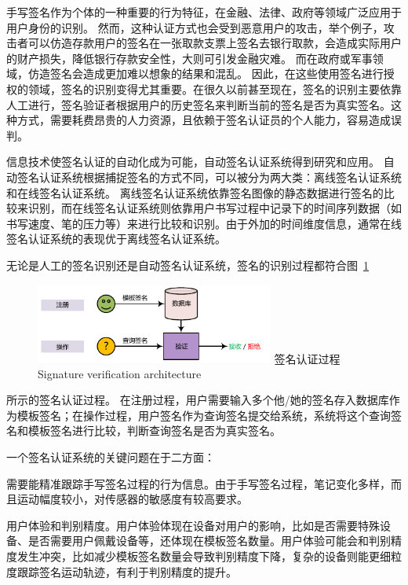 手写签名作为个体的一种重要的行为特征，在金融、法律、政府等领域广泛应用于用户身份的识别。 然而，这种认证方式也会受到恶意用户的攻击，举个例子，攻击者可以仿造存款用户的签名在一张取款支票上签名去银行取款，会造成实际用户的财产损失，降低银行存款安全性，大则可引发金融灾难。 而在政府或军事领域，仿造签名会造成更加难以想象的结果和混乱。 因此，在这些使用签名进行授权的领域，签名的识别变得尤其重要。在很久以前甚至现在，签名的识别主要依靠人工进行，签名验证者根据用户的历史签名来判断当前的签名是否为真实签名。这种方式，需要耗费昂贵的人力资源，且依赖于签名认证员的个人能力，容易造成误判。

信息技术使签名认证的自动化成为可能，自动签名认证系统得到研究和应用。 自动签名认证系统根据捕捉签名的方式不同，可以被分为两大类：离线签名认证系统和在线签名认证系统。 离线签名认证系统依靠签名图像的静态数据进行签名的比较来识别，而在线签名认证系统则依靠用户书写过程中记录下的时间序列数据（如书写速度、笔的压力等）来进行比较和识别。由于外加的时间维度信息，通常在线签名认证系统的表现优于离线签名认证系统。



无论是人工的签名识别还是自动签名认证系统，签名的识别过程都符合图~\ref{fig:signature-verification-architecture}
\begin{figure}[!htp]
  \centering
  \includegraphics[width=0.7\textwidth]{figure/verification-work-flow.pdf}
  \bicaption
    {签名认证过程}
    {Signature verification architecture}
  \label{fig:signature-verification-architecture}
\end{figure}所示的签名认证过程。 在注册过程，用户需要输入多个他/她的签名存入数据库作为模板签名；在操作过程，用户签名作为查询签名提交给系统，系统将这个查询签名和模板签名进行比较，判断查询签名是否为真实签名。

一个签名认证系统的关键问题在于二方面：
\begin{enumerate*}[label=\itshape\alph*)\upshape]
    \item 需要能精准跟踪手写签名过程的行为信息。由于手写签名过程，笔记变化多样，而且运动幅度较小，对传感器的敏感度有较高要求。
    \item 用户体验和判别精度。用户体验体现在设备对用户的影响，比如是否需要特殊设备、是否需要用户佩戴设备等，还体现在模板签名数量。用户体验可能会和判别精度发生冲突，比如减少模板签名数量会导致判别精度下降，复杂的设备则能更细粒度跟踪签名运动轨迹，有利于判别精度的提升。
\end{enumerate*}

